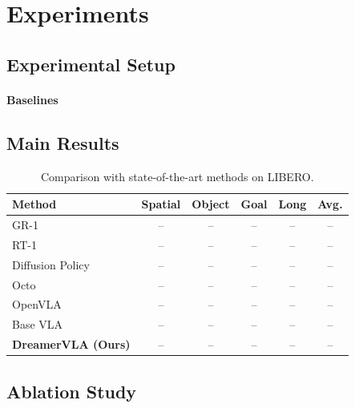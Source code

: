 \section{Experiments}

\subsection{Experimental Setup}

\paragraph{Baselines}

\subsection{Main Results}

\begin{table}[t]
\centering
\caption{Comparison with state-of-the-art methods on LIBERO.}
\label{tab:libero_main_simple}
\setlength{\tabcolsep}{6pt}
\begin{tabular}{lccccc}
\toprule
Method & Spatial & Object & Goal & Long & Avg. \\
\midrule
GR-1              & -- & -- & -- & -- & -- \\
RT-1              & -- & -- & -- & -- & -- \\
Diffusion Policy  & -- & -- & -- & -- & -- \\
Octo              & -- & -- & -- & -- & -- \\
OpenVLA           & -- & -- & -- & -- & -- \\
Base VLA          & -- & -- & -- & -- & -- \\
\midrule
\textbf{DreamerVLA (Ours)} & -- & -- & -- & -- & -- \\
\bottomrule
\end{tabular}
\end{table}

\subsection{Ablation Study}

